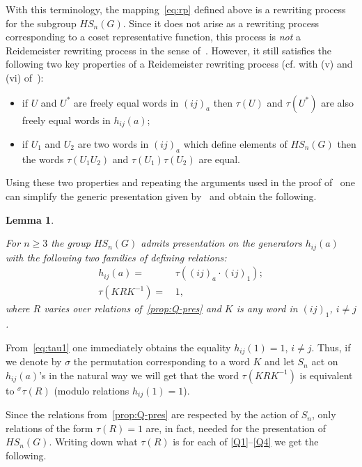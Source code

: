 \documentclass[oneside, 10pt]{amsart}
\theoremstyle{plain}
\numberwithin{equation}{section}
\newtheorem{lemma}{Lemma}
\numberwithin{lemma}{section}
\theoremstyle{remark}
\theoremstyle{definition}
\begin{document}
With this terminology, the mapping~\eqref{eq:rp} defined above is a rewriting process for the subgroup $HS_n(G)$.
Since it does not arise as a rewriting process corresponding to a coset representative function,
this process is {\it not} a Reidemeister rewriting process in the sense of~\cite[\S~2.3]{MKS76}.
However, it still satisfies the following two key properties of a Reidemeister rewriting process (cf. with (v) and (vi) of~\cite[\S~2.3]{MKS76}): 
\begin{itemize}
 \item if $U$ and $U^*$ are freely equal words in $(ij)_a$ then $\tau(U)$ and $\tau(U^*)$ are also freely equal words in $h_{ij}(a)$;
 \item if $U_1$ and $U_2$ are two words in $(ij)_a$ which define elements of $HS_n(G)$ then the words $\tau(U_1U_2)$ and $\tau(U_1) \tau(U_2)$ are equal.
\end{itemize}
Using these two properties and repeating the arguments used in the proof of~\cite[Theorem~2.8]{MKS76}
one can simplify the generic presentation given by~\cite[Theorem~2.6]{MKS76} and obtain the following.
\begin{lemma} \label{lm:h-gen}

 For $n\geq 3$ the group $HS_n(G)$ admits presentation on the generators $h_{ij}(a)$ with the following two families of defining relations:
 \begin{align}
  h_{ij}(a) = &\, \tau\left((ij)_a \cdot (ij)_1\right); \label{eq:tau1} \\
  \tau(KRK^{-1}) = &\, 1, \label{eq:tau2} 
 \end{align}  
 where $R$ varies over relations of~\cref{prop:Q-pres} and $K$ is any word in $(ij)_1$, $i\neq j$.
\end{lemma}

From~\eqref{eq:tau1} one immediately obtains the equality $h_{ij}(1)=1$, $i\neq j$.
Thus, if we denote by $\sigma$ the permutation corresponding to a word $K$ and let $S_n$ act on $h_{ij}(a)$'s in the natural way
 we will get that the word $\tau(KRK^{-1})$ is equivalent to ${}^{\sigma}\tau(R)$ (modulo relations $h_{ij}(1)=1$). 

Since the relations from~\cref{prop:Q-pres} are respected by the action of $S_n$,
 only relations of the form $\tau(R)=1$ are, in fact, needed for the presentation of $HS_n(G)$.
Writing down what $\tau(R)$ is for each of \eqref{Q1}--\eqref{Q4} we get the following.
 
\end{document}

